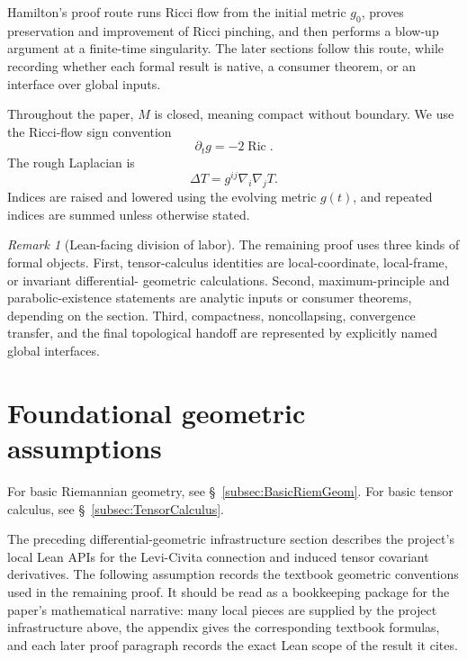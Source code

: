 \documentclass[11pt]{article}
\theoremstyle{plain}
\theoremstyle{definition}
\theoremstyle{remark}
\newtheorem{remark}[theorem]{Remark}
\newcommand{\Ric}{\operatorname{Ric}}
\begin{document}
Hamilton's proof route runs Ricci flow from the initial metric \(g_0\), proves
preservation and improvement of Ricci pinching, and then performs a blow-up
argument at a finite-time singularity.  The later sections follow this route,
while recording whether each formal result is native, a consumer theorem, or an
interface over global inputs.

Throughout the paper, $M$ is closed, meaning compact without boundary.  We use
the Ricci-flow sign convention
\[
  \partial_t g=-2\Ric.
\]
The rough Laplacian is
\[
  \Delta T=g^{ij}\nabla_i\nabla_jT.
\]
Indices are raised and lowered using the evolving metric $g(t)$, and repeated
indices are summed unless otherwise stated.

\begin{remark}[Lean-facing division of labor]
The remaining proof uses three kinds of formal objects.  First, tensor-calculus
identities are local-coordinate, local-frame, or invariant differential-
geometric calculations.  Second, maximum-principle and parabolic-existence
statements are analytic inputs or consumer theorems, depending on the section.
Third, compactness, noncollapsing, convergence transfer, and the final
topological handoff are represented by explicitly named global interfaces.
\end{remark}

\section{Foundational geometric assumptions}

For basic Riemannian geometry, see \S\ \ref{subsec:BasicRiemGeom}.  For basic
tensor calculus, see \S\ \ref{subsec:TensorCalculus}.

The preceding differential-geometric infrastructure section describes the
project's local Lean APIs for the Levi-Civita connection and induced tensor
covariant derivatives.  The following assumption records the textbook geometric
conventions used in the remaining proof.  It should be read as a bookkeeping
package for the paper's mathematical narrative: many local pieces are supplied
by the project infrastructure above, the appendix gives the corresponding
textbook formulas, and each later proof paragraph records the exact Lean scope
of the result it cites.
\end{document}
